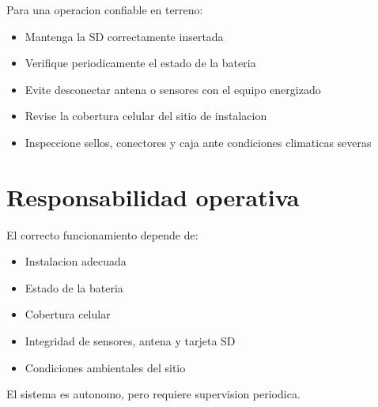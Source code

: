 \documentclass[11pt,a4paper]{article}
\begin{document}
Para una operacion confiable en terreno:

\begin{itemize}
  \item Mantenga la SD correctamente insertada
  \item Verifique periodicamente el estado de la bateria
  \item Evite desconectar antena o sensores con el equipo energizado
  \item Revise la cobertura celular del sitio de instalacion
  \item Inspeccione sellos, conectores y caja ante condiciones climaticas severas
\end{itemize}

\section{Responsabilidad operativa}

El correcto funcionamiento depende de:

\begin{itemize}
  \item Instalacion adecuada
  \item Estado de la bateria
  \item Cobertura celular
  \item Integridad de sensores, antena y tarjeta SD
  \item Condiciones ambientales del sitio
\end{itemize}

El sistema es autonomo, pero requiere supervision periodica.
\end{document}
